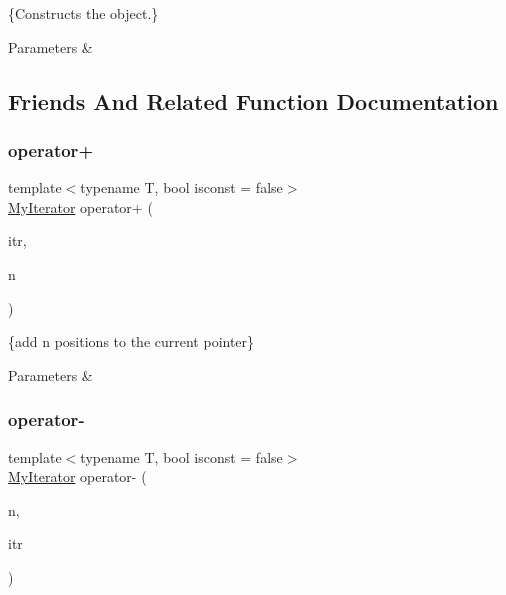 \{Constructs the object.\} 


\begin{DoxyParams}{Parameters}
{\em } & \\
\hline
\end{DoxyParams}


\subsection{Friends And Related Function Documentation}
\mbox{\label{classMyIterator_a00e9adb1f8c6f6c331689846c83ef9c0}} 
\subsubsection{\texorpdfstring{operator+}{operator+}}
{\footnotesize\ttfamily template$<$typename T, bool isconst = false$>$ \\
\hyperlink{classMyIterator}{My\+Iterator} operator+ (\begin{DoxyParamCaption}\item[{\hyperlink{classMyIterator}{My\+Iterator}$<$ T, isconst $>$}]{itr,  }\item[{\hyperlink{classMyIterator_ad6844a285132dae3746eab56209a19df}{difference\+\_\+type}}]{n }\end{DoxyParamCaption})\hspace{0.3cm}{\ttfamily [friend]}}



\{add n positions to the current pointer\} 


\begin{DoxyParams}{Parameters}
{\em } & \\
\hline
\end{DoxyParams}
\mbox{\label{classMyIterator_a5814a5d203e8f75aea64183bcb025db4}} 
\subsubsection{\texorpdfstring{operator-\/}{operator-}}
{\footnotesize\ttfamily template$<$typename T, bool isconst = false$>$ \\
\hyperlink{classMyIterator}{My\+Iterator} operator-\/ (\begin{DoxyParamCaption}\item[{\hyperlink{classMyIterator_ad6844a285132dae3746eab56209a19df}{difference\+\_\+type}}]{n,  }\item[{\hyperlink{classMyIterator}{My\+Iterator}$<$ T, isconst $>$}]{itr }\end{DoxyParamCaption})\hspace{0.3cm}{\ttfamily [friend]}}



